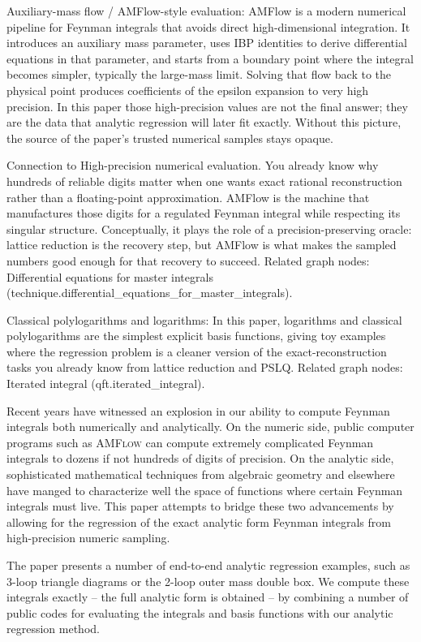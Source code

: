 \documentclass[a4paper,11pt]{article}
\begin{document}
\noindent Auxiliary-mass flow / AMFlow-style evaluation: AMFlow is a modern numerical pipeline for Feynman integrals that avoids direct high-dimensional integration. It introduces an auxiliary mass parameter, uses IBP identities to derive differential equations in that parameter, and starts from a boundary point where the integral becomes simpler, typically the large-mass limit. Solving that flow back to the physical point produces coefficients of the epsilon expansion to very high precision. In this paper those high-precision values are not the final answer; they are the data that analytic regression will later fit exactly. Without this picture, the source of the paper's trusted numerical samples stays opaque.\par Connection to High-precision numerical evaluation. You already know why hundreds of reliable digits matter when one wants exact rational reconstruction rather than a floating-point approximation. AMFlow is the machine that manufactures those digits for a regulated Feynman integral while respecting its singular structure. Conceptually, it plays the role of a precision-preserving oracle: lattice reduction is the recovery step, but AMFlow is what makes the sampled numbers good enough for that recovery to succeed. Related graph nodes: Differential equations for master integrals (technique.differential\_equations\_for\_master\_integrals).

\noindent Classical polylogarithms and logarithms: In this paper, logarithms and classical polylogarithms are the simplest explicit basis functions, giving toy examples where the regression problem is a cleaner version of the exact-reconstruction tasks you already know from lattice reduction and PSLQ. Related graph nodes: Iterated integral (qft.iterated\_integral).

\label{sec:conclusion}
Recent years have witnessed an explosion in our ability to compute Feynman integrals both numerically and analytically. On the numeric side, public computer programs such as  \textsc{AMFlow} can compute extremely complicated Feynman integrals to dozens if not hundreds of digits of precision. On the analytic side, sophisticated mathematical techniques from algebraic geometry and elsewhere have manged to 
characterize well the space of functions where certain Feynman integrals must live. This paper attempts to bridge these two advancements by allowing for the regression of the exact analytic form Feynman integrals from high-precision numeric sampling.


The paper presents a number of end-to-end analytic regression examples, such as 3-loop triangle diagrams or the 2-loop outer mass double box. We compute these integrals exactly --  the full analytic form is obtained -- by combining a number of public codes for evaluating the integrals and basis functions with our analytic regression method. 
\end{document}
